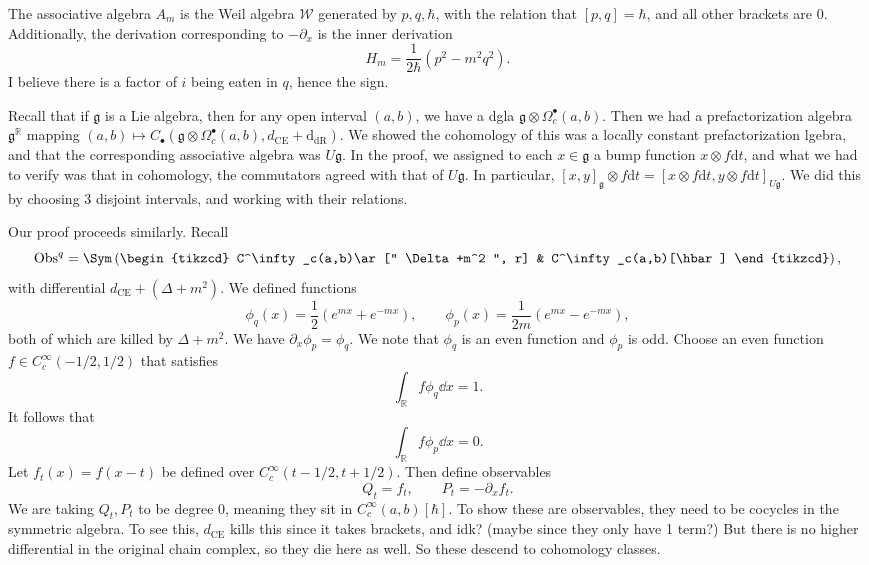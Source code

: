 \begin{proposition}\label{prp:5.0.5}
	The associative algebra $A_m$ is the Weil algebra $\mathcal{W}$ generated by $p,q, \hbar $, with the relation that $[p,q]=\hbar $, and all other brackets are 0. Additionally, the derivation corresponding to $-\partial _x$ is the inner derivation
	\[
		H_m = \frac{1}{2\hbar } \left( p^2 - m^2q^2 \right) 
	.\]
	I believe there is a factor of $i$ being eaten in $q$, hence the sign.
\end{proposition}

Recall that if $\mathfrak{g} $ is a Lie algebra, then for any open interval $(a,b)$, we have a dgla $\mathfrak{g} \otimes \Omega ^{\bullet} _c(a,b)$. Then we had a prefactorization algebra $\mathfrak{g} ^\mathbb{R} $ mapping $(a,b)\mapsto C_{\bullet} (\mathfrak{g} \otimes \Omega ^{\bullet} _c(a,b),d_{\mathrm{CE} } +\mathrm{d}_{\mathrm{dR} } )$. We showed the cohomology of this was a locally constant prefactorization lgebra, and that the corresponding associative algebra was $U\mathfrak{g} $. In the proof, we assigned to each $x\in \mathfrak{g} $ a bump function $x\otimes f\mathrm{d} t$, and what we had to verify was that in cohomology, the commutators agreed with that of $U\mathfrak{g} $. In particular, $[x,y]_{\mathfrak{g} }\otimes f\mathrm{d} t = [x\otimes f\mathrm{d} t,y\otimes f\mathrm{d} t]_{U\mathfrak{g} } $. We did this by choosing 3 disjoint intervals, and working with their relations.

Our proof proceeds similarly. Recall
\[
	\Obs^q = \Sym \left( 
		\begin{tikzcd}
			 C^\infty _c(a,b)\ar[" \Delta +m^2 ", r] & C^\infty _c(a,b)[\hbar ]
		\end{tikzcd}
	\right) ,
\]
with differential $d_{\mathrm{CE} } +(\Delta +m^2)$. We defined functions
\[
	\phi _q(x) = \frac{1}{2} \left( e^{mx} +e^{-mx} \right),\qquad \phi _p(x) = \frac{1}{2m} \left( e^{mx} -e^{-mx}  \right) ,
\]
both of which are killed by $\Delta +m^2$. We have $\partial _x\phi _p=\phi _q$. We note that $\phi _q$ is an even function and $\phi _p$ is odd. Choose an even function $f\in C^\infty _c(-1/2, 1/2)$ that satisfies
\[
	\int_{\mathbb{R} } f\phi _q\dd x=1
.\]
It follows that
\[
	\int_{\mathbb{R} } f\phi _p\dd x=0
.\]
Let $f_t(x)=f(x-t)$ be defined over $C^\infty _c(t-1/2, t+1/2)$. Then define observables
\[
	Q_t=f_t,\qquad P_t=-\partial _x f_t
.\]
We are taking $Q_t,P_t$ to be degree 0, meaning they sit in $C^\infty _c(a,b)[\hbar ]$. To show these are observables, they need to be cocycles in the symmetric algebra. To see this, $d_{\mathrm{CE} } $ kills this since it takes brackets, and idk? (maybe since they only have 1 term?) But there is no higher differential in the original chain complex, so they die here as well. So these descend to cohomology classes.

